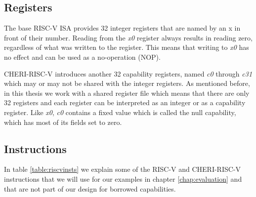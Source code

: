 \subsection{Registers}
The base RISC-V ISA provides 32 integer registers that are named by an x in front of their number.
Reading from the \textit{x0} register always results in reading zero, regardless of what was written to the register.
This means that writing to \textit{x0} has no effect and can be used as a no-operation (NOP).

CHERI-RISC-V introduces another 32 capability registers, named \textit{c0} through \textit{c31} which may or may not be shared with the integer registers.
As mentioned before, in this thesis we work with a shared register file which means that there are only 32 registers and each register can be interpreted as an integer or as a capability register.
Like \textit{x0}, \textit{c0} contains a fixed value which is called the null capability, which has most of its fields set to zero.

\subsection{Instructions}
In table \ref{table:riscvinsts} we explain some of the RISC-V and CHERI-RISC-V instructions that we will use for our examples in chapter \ref{chap:evaluation} and that are not part of our design for borrowed capabilities.

